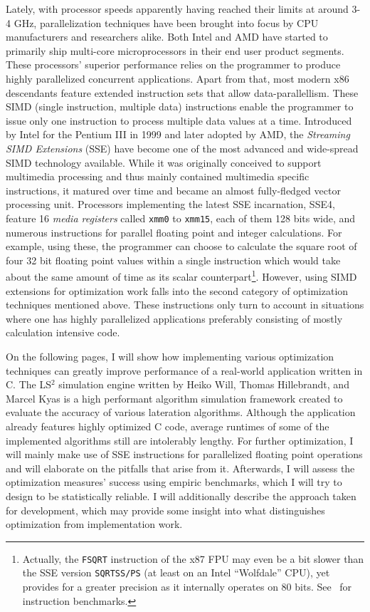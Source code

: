 Lately, with processor speeds apparently having reached their limits at around 3-4 GHz, parallelization techniques have been brought into focus by CPU manufacturers and researchers alike. Both Intel and AMD have started to primarily ship multi-core microprocessors in their end user product segments. These processors' superior performance relies on the programmer to produce highly parallelized concurrent applications. Apart from that, most modern x86 descendants feature extended instruction sets that allow data-parallellism. These SIMD (single instruction, multiple data) instructions enable the programmer to issue only one instruction to process multiple data values at a time. Introduced by Intel for the Pentium III in 1999 and later adopted by AMD, the \emph{Streaming SIMD Extensions} (SSE) have become one of the most advanced and wide-spread SIMD technology available. While it was originally conceived to support multimedia processing and thus mainly contained multimedia specific instructions, it matured over time and became an almost fully-fledged vector processing unit. Processors implementing the latest SSE incarnation, SSE4, feature 16 \emph{media registers} called \texttt{xmm0} to \texttt{xmm15}, each of them 128 bits wide, and numerous instructions for parallel floating point and integer calculations. For example, using these, the programmer can choose to calculate the square root of four 32 bit floating point values within a single instruction which would take about the same amount of time as its scalar counterpart\footnote{Actually, the \texttt{FSQRT} instruction of the x87 FPU may even be a bit slower than the SSE version \texttt{SQRTSS/PS} (at least on an Intel ``Wolfdale'' CPU), yet provides for a greater precision as it internally operates on 80 bits. See~\cite{fog2011instructiontables} for instruction benchmarks.}. However, using SIMD extensions for optimization work falls into the second category of optimization techniques mentioned above. These instructions only turn to account in situations where one has highly parallelized applications preferably consisting of mostly calculation intensive code.

On the following pages, I will show how implementing various optimization techniques can greatly improve performance of a real-world application written in C. The LS$^{2}$ simulation engine written by Heiko Will, Thomas Hillebrandt, and Marcel Kyas is a high performant algorithm simulation framework created to evaluate the accuracy of various lateration algorithms. Although the application already features highly optimized C code, average runtimes of some of the implemented algorithms still are intolerably lengthy. For further optimization, I will mainly make use of SSE instructions for parallelized floating point operations and will elaborate on the pitfalls that arise from it. Afterwards, I will assess the optimization measures' success using empiric benchmarks, which I will try to design to be statistically reliable. I will additionally describe the approach taken for development, which may provide some insight into what distinguishes optimization from implementation work.

